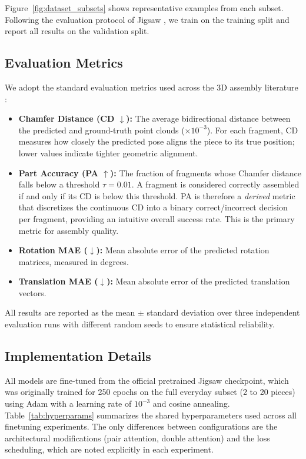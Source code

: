 Figure~\ref{fig:dataset_subsets} shows representative examples from each subset. Following the evaluation protocol of Jigsaw \cite{lu2023jigsaw}, we train on the training split and report all results on the validation split.

\subsection{Evaluation Metrics}

We adopt the standard evaluation metrics used across the 3D assembly literature \cite{lu2023jigsaw, sellan2022breaking}:

\begin{itemize}
    \item \textbf{Chamfer Distance (CD $\downarrow$):} The average bidirectional distance between the predicted and ground-truth point clouds ($\times 10^{-3}$). For each fragment, CD measures how closely the predicted pose aligns the piece to its true position; lower values indicate tighter geometric alignment.
    \item \textbf{Part Accuracy (PA $\uparrow$):} The fraction of fragments whose Chamfer distance falls below a threshold $\tau = 0.01$. A fragment is considered correctly assembled if and only if its CD is below this threshold. PA is therefore a \emph{derived} metric that discretizes the continuous CD into a binary correct/incorrect decision per fragment, providing an intuitive overall success rate. This is the primary metric for assembly quality.
    \item \textbf{Rotation MAE ($\downarrow$):} Mean absolute error of the predicted rotation matrices, measured in degrees.
    \item \textbf{Translation MAE ($\downarrow$):} Mean absolute error of the predicted translation vectors.
\end{itemize}

All results are reported as the mean $\pm$ standard deviation over three independent evaluation runs with different random seeds to ensure statistical reliability.

\subsection{Implementation Details}
\label{sec:impl_details}

All models are fine-tuned from the official pretrained Jigsaw checkpoint, which was originally trained for 250 epochs on the full everyday subset (2 to 20 pieces) using Adam with a learning rate of $10^{-3}$ and cosine annealing. Table~\ref{tab:hyperparams} summarizes the shared hyperparameters used across all finetuning experiments. The only differences between configurations are the architectural modifications (pair attention, double attention) and the loss scheduling, which are noted explicitly in each experiment.

